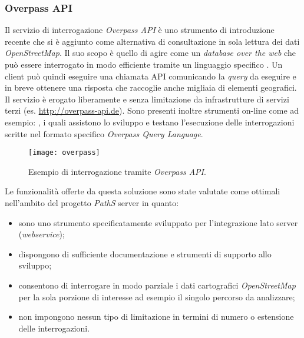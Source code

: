 \subsubsection{Overpass API}
Il servizio di interrogazione \emph{Overpass API} è uno strumento di introduzione recente che si è aggiunto come alternativa di consultazione in sola lettura dei dati \emph{OpenStreetMap}. Il suo scopo è quello di agire come un \emph{database over the web} che può essere interrogato in modo efficiente tramite un linguaggio specifico \cite{overpass-api}. Un client può quindi eseguire una chiamata API comunicando la \emph{query} da eseguire e in breve ottenere una risposta che raccoglie anche migliaia di elementi geografici. Il servizio è erogato liberamente e senza limitazione da infrastrutture di servizi terzi (es. \url{http://overpass-api.de}). Sono presenti inoltre strumenti on-line come ad esempio: \cite[Overpass~Turbo]{overpass-turbo}, i quali assistono lo sviluppo e testano l'esecuzione delle interrogazioni scritte nel formato specifico \emph{Overpass Query Language}.

\begin{figure}[ht]
  \centering
  \texttt{[image: overpass]}
  \caption{\footnotesize{Esempio di interrogazione tramite \emph{Overpass API}.}}
  \label{fig:overpass}
\end{figure}

Le funzionalità offerte da questa soluzione sono state valutate come ottimali nell'ambito del progetto \emph{PathS} server in quanto:
\begin{itemize}
\item sono uno strumento specificatamente sviluppato per l'integrazione lato server (\emph{webservice});
\item dispongono di sufficiente documentazione e strumenti di supporto allo sviluppo;
\item consentono di interrogare in modo parziale i dati cartografici \emph{OpenStreetMap} per la sola porzione di interesse ad esempio il singolo percorso da analizzare;
\item non impongono nessun tipo di limitazione in termini di numero o estensione delle interrogazioni.
\end{itemize}

